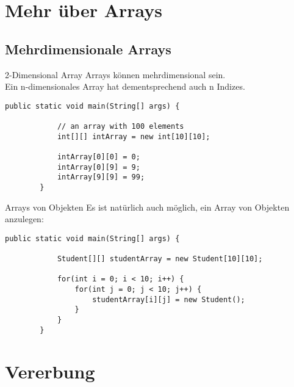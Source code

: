 \section{Mehr über Arrays}
\subsection{Mehrdimensionale Arrays}
\begin{frame}[fragile]{2-Dimensional Array}
	Arrays können mehrdimensional sein. \\
    Ein n-dimensionales Array hat dementsprechend auch n Indizes.
    \begin{lstlisting}[gobble=8]
        public static void main(String[] args) {

            // an array with 100 elements
            int[][] intArray = new int[10][10];
            
            intArray[0][0] = 0;
            intArray[0][9] = 9;
            intArray[9][9] = 99;
        }
	\end{lstlisting}
\end{frame}

\begin{frame}[fragile]{Arrays von Objekten}
    Es ist natürlich auch möglich, ein Array von Objekten anzulegen:
    \begin{lstlisting}[gobble=8]
        public static void main(String[] args) {

            Student[][] studentArray = new Student[10][10];
            
            for(int i = 0; i < 10; i++) {
                for(int j = 0; j < 10; j++) {
                    studentArray[i][j] = new Student();
                }
            }
        }
	\end{lstlisting}
\end{frame}

\section{Vererbung}
